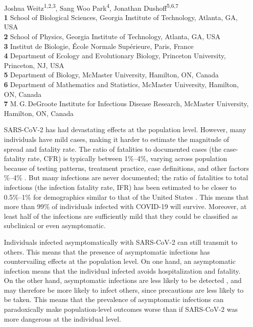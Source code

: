 \documentclass[12pt]{article}
\date{\today}
\begin{document}
\begin{flushleft}{
	\Large
	\textbf{}
}
\newline
\\
Joshua Weitz\textsuperscript{1,2,3},
Sang Woo Park\textsuperscript{4},
Jonathan Dushoff\textsuperscript{5,6,7}
\\
\bigskip
\textbf{1} School of Biological Sciences, Georgia Institute of Technology, Atlanta, GA, USA
\\
\textbf{2} School of Physics, Georgia Institute of Technology, Atlanta, GA, USA
\\
\textbf{3} Institut de Biologie, \'{E}cole Normale Sup\'{e}rieure, Paris, France
\\
\textbf{4} Department of Ecology and Evolutionary Biology, Princeton University, Princeton, NJ, USA
\\
\textbf{5} Department of Biology, McMaster University, Hamilton, ON, Canada
\\
\textbf{6} Department of Mathematics and Statistics, McMaster University, Hamilton, ON, Canada
\\
\textbf{7} M.\,G.\,DeGroote Institute for Infectious Disease Research, McMaster University, Hamilton, ON, Canada
\\
\bigskip

\bigskip
\end{flushleft}

SARS-CoV-2 has had devastating effects at the population level.
However, many individuals have mild cases, making it harder to estimate the magnitude of spread and fatality rate. 
The ratio of fatalities to documented cases (the case-fatality rate, CFR) is typically between 1\%--4\%, varying across population because of testing patterns, treatment practice, case definitions, and other factors \%--4\% \citep{rajgor2020many,VERITY2020669,yang2020early}.
But many infections are never documented;
the ratio of fatalities to total infections (the infection fatality rate, IFR) has been estimated to be closer to 0.5\%--1\% for demographics similar to that of the United States \citep{levin2020assessing}. 
This means that more than 99\% of individuals infected with COVID-19 will survive. 
Moreover, at least half of the infections are sufficiently mild that they could be classified as subclinical or even asymptomatic. 

Individuals infected asymptomatically with SARS-CoV-2 can still transmit to others. 
This means that the presence of asymptomatic infections has countervailing effects at the population level. 
On one hand, an asymptomatic infection means that the individual infected avoids hospitalization and fatality. 
On the other hand, asymptomatic infections are less likely to be detected \citep{fraser2004factors}, and may therefore be more likely to infect others, since precautions are less likely to be taken.
This means that the prevalence of asymptomatic infections can paradoxically make population-level outcomes worse than if SARS-CoV-2 was more dangerous at the individual level.
\end{document}
